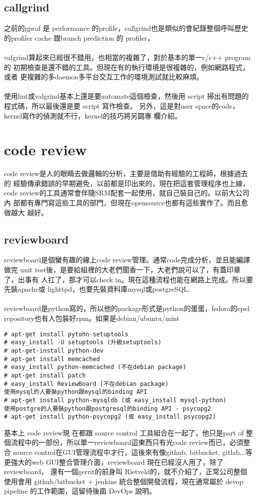     \subsection{callgrind}
    之前的gprof 是 performance 的profile，callgrind也是類似的會紀錄整個呼叫歷史
    的profiler cache 跟branch prediction 的 profiler，
  \\\\
  valgrind算起來已經很不錯用，也相當的複雜了，對於基本的單一c/c++ program的
  初期檢查是還不錯的工具。但現在有的執行環境是很複雜的，例如網路程式，或者
  更複雜的多daemon多平台交互工作的環境測試就比較麻煩。
  \\\\
  使用lint或valgrind基本上還是要automate這個檢查，然後用
  script 掃出有問題的程式碼，所以最後還是要 script 寫作檢查。
  另外，這是對user space的code，kernel寫作的偵測就不行，kernel的技巧將另闢專
  欄介紹。

  \section{code review}
    code review是人的眼睛去做邏輯的分析，主要是借助有經驗的工程師，根據過去的
    經驗傳承錯誤的早期避免，以前都是印出來的，現在把這套管理程序也上線，
    code review的工具通常會伴隨SRM配套一起使用，就自己裝自己的。以前大公司內
    部都有專門寫這些工具的部門，但現在opensource也都有這些實作了。而且愈做越大
    越好。
    \subsection{reviewboard}
    reviewboard是個蠻有趣的線上code review管理。通常code完成分析，並且能編譯做完
    unit test後，是要給組裡的大老們聞香一下，大老們說可以了，有蓋印章了，出事有
    人扛了，那才可以check in。現在這種流程也能在網路上完成。所以要先裝apache或
    lighttpd，也要先裝資料庫mysql或postgreSQL.
    \\\\
    reviewboard是python寫的，所以他的package形式是python的蛋蛋，fedora的epel
    repository也有人包裝好rpm。如果是debian/ubuntu/mint
    \begin{verbatim}
# apt-get install pytohn-setuptools
# easy_install -U setuptools (升級setuptools)
# apt-get-install python-dev
# apt-get install memcached
# easy_install python-memcached (不在debian package)
# apt-get install patch
# easy_install ReviewBoard (不在debian package)
使用mysql的人要裝python跟mysql的binding API
# apt-get install python-mysqldb (或 easy_install mysql-python)
使用postgre的人要裝python跟postgresql的binding API - psycopg2
# apt-get install python-psycopg2 (或 easy_install psycopg2)
    \end{verbatim}

    基本上 code review現 在都跟 source control 工具組合在一起了，他只是part of
    整個流程中的一部份，所以單一reviewboard這東西只有光code review而已，必須整合
    source control在GUI管理流程中才行，這後來有像github, bitbucket, gitlab...等
    更強大的web GUI整合管理介面，reviewboard 現在已經沒人用了，除了reviewboard，
    還有一個gerrit的前身叫 Rietveld的，就不介紹了，正常公司整個使用會用 
    github/bitbucket + jenkins 統合整個開發流程，現在通常屬於 devop pipeline 
    的工作範圍，這留待後面 DevOps 說明。
